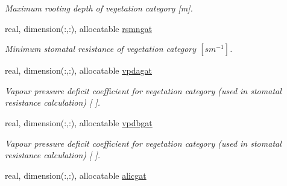 \begin{DoxyCompactItemize}
\begin{DoxyCompactList}\small\item\em Maximum rooting depth of vegetation category \mbox{[}m\mbox{]}. \end{DoxyCompactList}\item 
\hypertarget{structclass__statevars_1_1class__gather_a0d8afc36b879ca7133de3fd7cbea78af}{}real, dimension(\+:,\+:), allocatable \hyperlink{structclass__statevars_1_1class__gather_a0d8afc36b879ca7133de3fd7cbea78af}{rsmngat}\label{structclass__statevars_1_1class__gather_a0d8afc36b879ca7133de3fd7cbea78af}

\begin{DoxyCompactList}\small\item\em Minimum stomatal resistance of vegetation category $[s m^{-1} ]$. \end{DoxyCompactList}\item 
\hypertarget{structclass__statevars_1_1class__gather_abdad617b6125244cc95172180b51be78}{}real, dimension(\+:,\+:), allocatable \hyperlink{structclass__statevars_1_1class__gather_abdad617b6125244cc95172180b51be78}{vpdagat}\label{structclass__statevars_1_1class__gather_abdad617b6125244cc95172180b51be78}

\begin{DoxyCompactList}\small\item\em Vapour pressure deficit coefficient for vegetation category (used in stomatal resistance calculation) \mbox{[} \mbox{]}. \end{DoxyCompactList}\item 
\hypertarget{structclass__statevars_1_1class__gather_a7dab5eab97bbfb4c0d1ea52af017f657}{}real, dimension(\+:,\+:), allocatable \hyperlink{structclass__statevars_1_1class__gather_a7dab5eab97bbfb4c0d1ea52af017f657}{vpdbgat}\label{structclass__statevars_1_1class__gather_a7dab5eab97bbfb4c0d1ea52af017f657}

\begin{DoxyCompactList}\small\item\em Vapour pressure deficit coefficient for vegetation category (used in stomatal resistance calculation) \mbox{[} \mbox{]}. \end{DoxyCompactList}\item 
\hypertarget{structclass__statevars_1_1class__gather_ac590cd83a8fadd37463f3fba7745ce76}{}real, dimension(\+:,\+:), allocatable \hyperlink{structclass__statevars_1_1class__gather_ac590cd83a8fadd37463f3fba7745ce76}{alicgat}\label{structclass__statevars_1_1class__gather_ac590cd83a8fadd37463f3fba7745ce76}


\end{DoxyCompactItemize}
